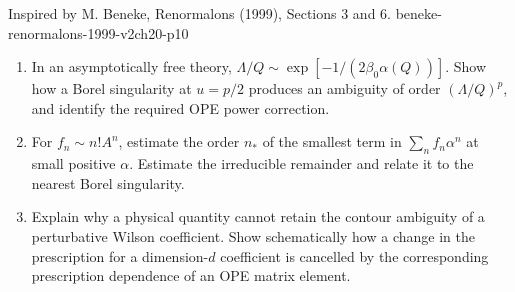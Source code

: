 \begin{enumerate}
  {Inspired by M. Beneke, Renormalons (1999), Sections 3 and 6.}
  {beneke-renormalons-1999-v2ch20-p10}
  \begin{enumerate}
    \item[(a)]
    In an asymptotically free theory,
    \(\Lambda/Q\sim\exp[-1/(2\beta_0\alpha(Q))]\).
    Show how a Borel singularity at \(u=p/2\) produces an ambiguity of
    order \((\Lambda/Q)^p\), and identify the required OPE power correction.
    \item[(b)]
    For \(f_n\sim n!A^n\), estimate the order \(n_*\) of the smallest term
    in \(\sum_nf_n\alpha^n\) at small positive \(\alpha\).  Estimate the
    irreducible remainder and relate it to the nearest Borel singularity.
    \item[(c)]
    Explain why a physical quantity cannot retain the contour ambiguity of
    a perturbative Wilson coefficient.  Show schematically how a change in
    the prescription for a dimension-\(d\) coefficient is cancelled by
    the corresponding prescription dependence of an OPE matrix element.
  \end{enumerate}

\end{enumerate}
